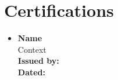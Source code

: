 \section{Certifications}
\begin{itemize}
    \item \textbf{Name} \\
     Context\\
     \textbf{Issued by:}  \\
     \textbf{Dated:} 
    
\end{itemize}
